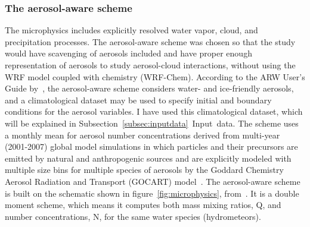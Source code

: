 \subsubsection{The aerosol-aware scheme}
The microphysics includes explicitly resolved water vapor, cloud, and precipitation processes. The aerosol-aware scheme was chosen so that the study would have scavenging of aerosols included and have proper enough representation of aerosols to study aerosol-cloud interactions, without using the WRF model coupled with chemistry (WRF-Chem).
According to the ARW User's Guide by~\citet{Wang2015}, the aerosol-aware scheme considers water- and ice-friendly aerosols, and a climatological dataset may be used to specify initial and boundary conditions for the aerosol variables. I have used this climatological dataset, which will be explained in Subsection~\ref{subsec:inputdata}~Input~data. The scheme uses a monthly mean for aerosol number concentrations derived from multi-year (2001-2007) global model simulations in which particles and their precursors are emitted by natural and anthropogenic sources and are explicitly modeled with multiple size bins for multiple species of aerosols by the Goddard Chemistry Aerosol Radiation and Transport (GOCART) model~\citep{Thompson2014}.
The aerosol-aware scheme~\citep{Thompson2014} is built on the schematic shown in figure~\ref{fig:microphysics}, from~\citet{Reisner1998}. It is a double moment scheme, which means it computes both mass mixing ratios, Q, and number concentrations, N, for the same water species (hydrometeors). 

